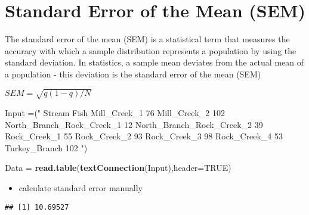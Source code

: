 \documentclass[
]{article}
\newenvironment{Shaded}{\begin{snugshade}}{\end{snugshade}}
\newcommand{\DataTypeTok}[1]{\textcolor[rgb]{0.13,0.29,0.53}{#1}}
\newcommand{\KeywordTok}[1]{\textcolor[rgb]{0.13,0.29,0.53}{\textbf{#1}}}
\newcommand{\NormalTok}[1]{#1}
\newcommand{\OperatorTok}[1]{\textcolor[rgb]{0.81,0.36,0.00}{\textbf{#1}}}
\newcommand{\OtherTok}[1]{\textcolor[rgb]{0.56,0.35,0.01}{#1}}
\newcommand{\StringTok}[1]{\textcolor[rgb]{0.31,0.60,0.02}{#1}}
\providecommand{\tightlist}{%
  \setlength{\itemsep}{0pt}\setlength{\parskip}{0pt}}
\begin{document}
\hypertarget{standard-error-of-the-mean-sem}{%
\section{Standard Error of the Mean
(SEM)}\label{standard-error-of-the-mean-sem}}

The standard error of the mean (SEM) is a statistical term that measures
the accuracy with which a sample distribution represents a population by
using the standard deviation. In statistics, a sample mean deviates from
the actual mean of a population - this deviation is the standard error
of the mean (SEM)

\(SEM = \sqrt{q(1-q)/N}\)

\begin{Shaded}
\begin{Highlighting}[]
\NormalTok{Input =(}\StringTok{"}
\StringTok{Stream                     Fish}
\StringTok{ Mill_Creek_1                76}
\StringTok{ Mill_Creek_2               102}
\StringTok{ North_Branch_Rock_Creek_1   12}
\StringTok{ North_Branch_Rock_Creek_2   39}
\StringTok{ Rock_Creek_1                55}
\StringTok{ Rock_Creek_2                93}
\StringTok{ Rock_Creek_3                98}
\StringTok{ Rock_Creek_4                53}
\StringTok{ Turkey_Branch              102}
\StringTok{"}\NormalTok{)}

\NormalTok{Data =}\StringTok{ }\KeywordTok{read.table}\NormalTok{(}\KeywordTok{textConnection}\NormalTok{(Input),}\DataTypeTok{header=}\OtherTok{TRUE}\NormalTok{)}
\end{Highlighting}
\end{Shaded}

\begin{itemize}
\tightlist
\item
  calculate standard error manually
\end{itemize}

\begin{Shaded}
\end{Shaded}

\begin{verbatim}
## [1] 10.69527
\end{verbatim}
\end{document}
